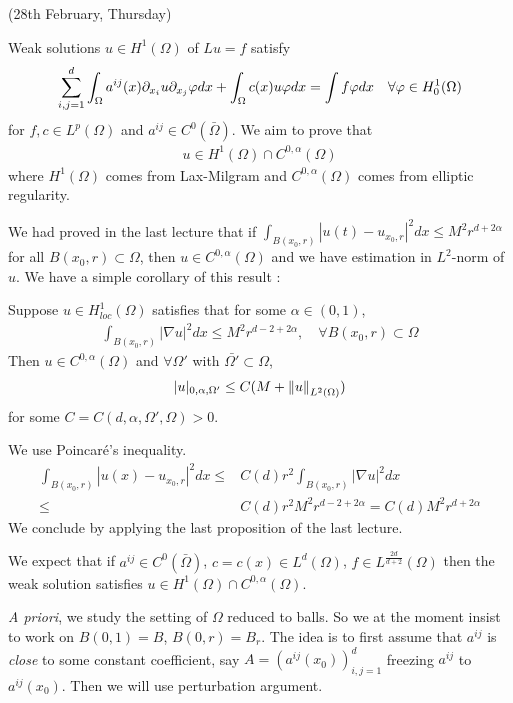 \documentclass[12pt,a4paper]{article}
\newenvironment{proof}
{\begin{changemargin}{0.5cm}{0.5cm} 
	}%
	{\end{changemargin}
}
\newenvironment{p}
{\begin{proof} 
	}%
	{\end{proof}
}
\begin{document}
\newday

(28th February, Thursday)
\s

Weak solutions $u\in H^1(\Omega)$ of $Lu = f$ satisfy
\begin{align*}
\sum_{i,j=1}^d \int_{\Omega} a^{ij}(x) \partial_{x_i} u \partial_{x_j} \varphi dx + \int_{\Omega} c(x) u\varphi dx = \int f\varphi dx \quad \forall \varphi \in H_0^1(\Omega)
\end{align*}
for $f,c \in L^p(\Omega)$ and $a^{ij} \in C^0(\bar{\Omega})$. We aim to prove that
\begin{align*}
u\in H^1(\Omega) \cap C^{0, \alpha}(\Omega)
\end{align*}
where $H^1(\Omega)$ comes from Lax-Milgram and $C^{0, \alpha}(\Omega)$ comes from elliptic regularity. 

\quad We had proved in the last lecture that if $\int_{B(x_0, r)} |u(t) - u_{x_0, r}|^2 dx \leq M^2 r^{d+2\alpha}$ for all $B(x_0, r) \subset \Omega$, then $u\in C^{0, \alpha}(\Omega)$ and we have estimation in $L^2$-norm of $u$. We have a simple corollary of this result :
\s

\corr Suppose $u\in H^1_{loc} (\Omega)$ satisfies that for some $\alpha \in (0,1)$,
\begin{align*}
\int_{B(x_0, r)} |\nabla u|^2 dx \leq M^2 r^{d-2 + 2\alpha}, \quad \forall B(x_0, r) \subset \Omega
\end{align*}
Then $u\in C^{0, \alpha}(\Omega)$ and $\forall \Omega'$ with $\bar{\Omega'} \subset \Omega$,
\begin{align*}
|u|_{0, \alpha, \Omega'} \leq C(M + \snorms{u}{L^2(\Omega)})
\end{align*}
for some $C = C(d, \alpha, \Omega', \Omega) >0$.
\begin{p}
\pf We use Poincar\'e's inequality.
\begin{align*}
\int_{B(x_0, r)} |u(x) - u_{x_0, r}|^2 dx \leq & C(d) r^2 \int_{B(x_0, r)} |\nabla u|^2 dx \\
\leq & C(d) r^2 M^2 r^{d-2+2\alpha} = C(d) M^2 r^{d+ 2\alpha}
\end{align*}
We conclude by applying the last proposition of the last lecture.

\eop 
\end{p}
\s

We expect that if $a^{ij} \in C^0(\bar{\Omega})$, $c =c(x) \in L^d(\Omega)$, $f\in L^{\frac{2d}{d+2}}(\Omega)$ then the weak solution satisfies $u\in H^1(\Omega) \cap C^{0, \alpha}(\Omega)$.
\s

\textit{A priori}, we study the setting of $\Omega$ reduced to balls. So we at the moment insist to work on $B(0, 1) =B$, $B(0, r)=B_r$. The idea is to first assume that $a^{ij}$ is \emph{close} to some constant coefficient, say $A = (a^{ij}(x_0))_{i,j=1}^d$ freezing $a^{ij}$ to $a^{ij}(x_0)$. Then we will use perturbation argument.
\end{document}
